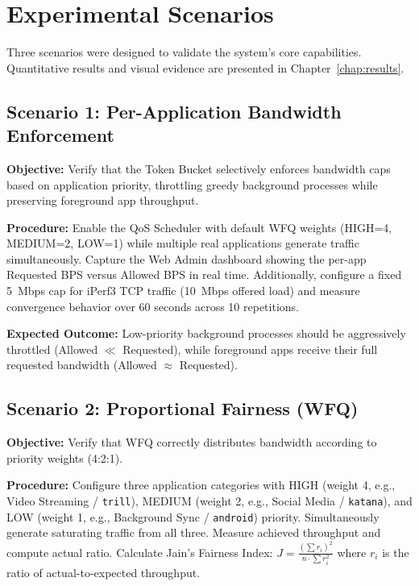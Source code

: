 \section{Experimental Scenarios}
\label{sec:scenarios}

Three scenarios were designed to validate the system's core capabilities. Quantitative results and visual evidence are presented in Chapter~\ref{chap:results}.

\subsection{Scenario 1: Per-Application Bandwidth Enforcement}

\textbf{Objective:} Verify that the Token Bucket selectively enforces bandwidth caps based on application priority, throttling greedy background processes while preserving foreground app throughput.

\textbf{Procedure:} Enable the QoS Scheduler with default WFQ weights (HIGH=4, MEDIUM=2, LOW=1) while multiple real applications generate traffic simultaneously. Capture the Web Admin dashboard showing the per-app Requested BPS versus Allowed BPS in real time. Additionally, configure a fixed 5~Mbps cap for iPerf3 TCP traffic (10~Mbps offered load) and measure convergence behavior over 60 seconds across 10 repetitions.

\textbf{Expected Outcome:} Low-priority background processes should be aggressively throttled (Allowed $\ll$ Requested), while foreground apps receive their full requested bandwidth (Allowed $\approx$ Requested).

\subsection{Scenario 2: Proportional Fairness (WFQ)}

\textbf{Objective:} Verify that WFQ correctly distributes bandwidth according to priority weights (4:2:1).

\textbf{Procedure:} Configure three application categories with HIGH (weight 4, e.g., Video Streaming / \texttt{trill}), MEDIUM (weight 2, e.g., Social Media / \texttt{katana}), and LOW (weight 1, e.g., Background Sync / \texttt{android}) priority. Simultaneously generate saturating traffic from all three. Measure achieved throughput and compute actual ratio. Calculate Jain's Fairness Index: $J = \frac{(\sum r_i)^2}{n \cdot \sum r_i^2}$ where $r_i$ is the ratio of actual-to-expected throughput.

